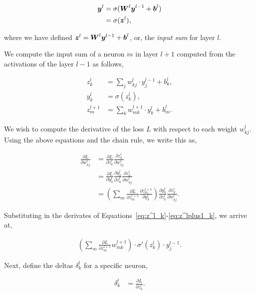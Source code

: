 \begin{align}
    {\boldsymbol{{y}}}^l &= \sigma({\boldsymbol{{W}}}^l {\boldsymbol{{y}}}^{l-1} + {\boldsymbol{{b}}}^l) \\
              &= \sigma({\boldsymbol{{z}}}^l),
\end{align}

where we have defined \({\boldsymbol{{z}}}^l = {\boldsymbol{{W}}}^l {\boldsymbol{{y}}}^{l-1} + {\boldsymbol{{b}}}^l\), or, the \textit{input sum} for layer \(l\).

We compute the input sum of a neuron \(m\) in layer \(l+1\) computed from the activations of the layer \(l-1\) as follows,

\begin{align}
    z^l_k &= \sum_{j} w^l_{kj} \cdot y^{l-1}_j + b^l_k,\label{eq:z^l_k} \\
    y^l_k &= \sigma (z^l_k),\label{eq:a^l_l} \\
    z^{l+1}_m &= \sum_{k} w^{l+1}_{mk} \cdot y^l_k + b^l_m.\label{eq:z^lplus1_k}
\end{align}

We wish to compute the derivative of the loss \(L\) with respect to each weight \(w^l_{kj}\). Using the above equations and the chain rule, we write this as,

\begin{align}
    \frac{\partial L}{\partial w^l_{kj}} &= \frac{\partial L}{\partial z^l_k} \frac{\partial z^l_k}{\partial w^l_{kj}} \\
    &= \frac{\partial L}{\partial y^l_k} \frac{\partial y^l_k}{\partial z^l_k} \frac{\partial z^l_k}{\partial w^l_{kj}} \\
    &= \left(
        \sum_{m} \frac{\partial L}{\partial z^{l+1}_m} \frac{\partial z^{l+1}_m}{\partial y^l_k}
    \right)
    \frac{\partial y^l_k}{\partial z^l_k} \frac{\partial z^l_k}{\partial w^l_{kj}}.
\end{align}

Substituting in the derivates of Equations~\ref{eq:z^l_k}-\ref{eq:z^lplus1_k}, we arrive at,

\begin{align}
    \left(
        \sum_{m} \frac{\partial L}{\partial z^{l+1}_m} w^{l+1}_{mk}
    \right) \cdot
    \sigma'(z^l_k) \cdot
    y^{l-1}_j.
\end{align}

Next, define the deltas \(\delta^l_k\) for a specific neuron,

\begin{align}
    \delta^l_k &= \frac{\partial L}{\partial z^l_k}.
\end{align}

